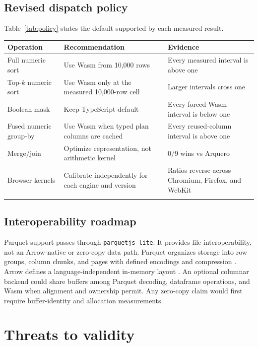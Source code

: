 \documentclass[pdflatex,sn-basic,Numbered]{sn-jnl}
\begin{document}
\subsection{Revised dispatch policy}

Table~\ref{tab:policy} states the default supported by each measured result.

\begin{center}
\label{tab:policy}
\small
\begin{tabularx}{\textwidth}{@{}p{28mm}Xp{38mm}@{}}
\toprule
Operation & Recommendation & Evidence \\
\midrule
Full numeric sort & Use Wasm from 10,000 rows & Every measured interval is above one \\
Top-$k$ numeric sort & Use Wasm only at the measured 10,000-row cell & Larger intervals cross one \\
Boolean mask & Keep TypeScript default & Every forced-Wasm interval is below one \\
Fused numeric group-by & Use Wasm when typed plan columns are cached & Every reused-column interval is above one \\
Merge/join & Optimize representation, not arithmetic kernel & 0/9 wins vs Arquero \\
Browser kernels & Calibrate independently for each engine and version & Ratios reverse across Chromium, Firefox, and WebKit \\
\botrule
\end{tabularx}
\end{center}

\subsection{Interoperability roadmap}

Parquet support passes through \texttt{parquetjs-lite}. It provides file interoperability, not an Arrow-native or zero-copy data path. Parquet organizes storage into row groups, column chunks, and pages with defined encodings and compression \cite{parquetformat}. Arrow defines a language-independent in-memory layout \cite{arrowformat}. An optional columnar backend could share buffers among Parquet decoding, dataframe operations, and Wasm when alignment and ownership permit. Any zero-copy claim would first require buffer-identity and allocation measurements.

\section{Threats to validity}\label{sec:threats}
\end{document}
